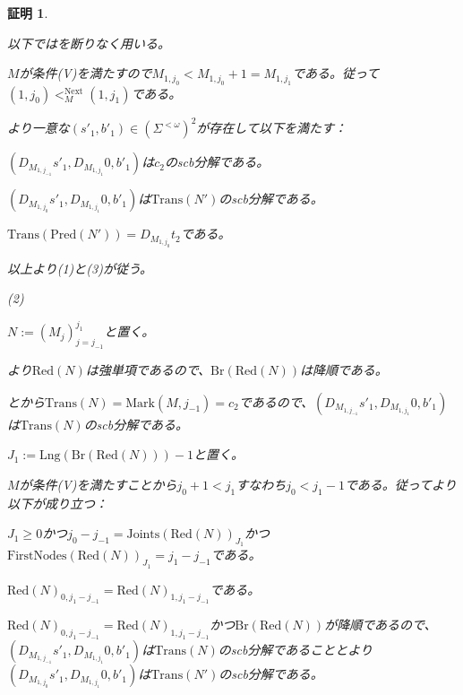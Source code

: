 \documentclass[dvipdfmx,uplatex]{jsarticle}
\theoremstyle{customnonumberbreakfortheorem}
\theoremstyle{customnonumberbreakforproof}
\newtheorem{hideableproof}{証明}
\begin{document}
\begin{hideableproof}
	\begin{indented}
		\item 以下ではを断りなく用いる。
		\item \(M\)が条件(V)を満たすので\(M_{1,j_0} < M_{1,j_0}+1 = M_{1,j_1}\)である。従って\((1,j_0) <_M^{\textrm{Next}} (1,j_1)\)である。
		\item {}より一意な\((s'_1,b'_1) \in (\Sigma^{< \omega})^2\)が存在して以下を満たす：
		\begin{penumerate}
			\item \((D_{M_{1,j_{-1}}} s'_1,D_{M_{1,j_1}} 0,b'_1)\)は\(c_2\)のscb分解である。
			\item \((D_{M_{1,j_0}} s'_1,D_{M_{1,j_1}} 0,b'_1)\)は\(\textrm{Trans}(N')\)のscb分解である。
			\item \(\textrm{Trans}(\textrm{Pred}(N')) = D_{M_{1,j_0}} t_2\)である。
		\end{penumerate}
		\item 以上より(1)と(3)が従う。
		\item
		\item (2)
		\item \(N := (M_j)_{j=j_{-1}}^{j_1}\)と置く。
		\item {}より\(\textrm{Red}(N)\)は強単項であるので、\(\textrm{Br}(\textrm{Red}(N))\)は降順である。
		\item {}とから\(\textrm{Trans}(N) = \textrm{Mark}(M,j_{-1}) = c_2\)であるので、\((D_{M_{1,j_{-1}}} s'_1,D_{M_{1,j_1}} 0,b'_1)\)は\(\textrm{Trans}(N)\)のscb分解である。
		\item \(J_1 := \textrm{Lng}(\textrm{Br}(\textrm{Red}(N)))-1\)と置く。
		\item \(M\)が条件(V)を満たすことから\(j_0+1 < j_1\)すなわち\(j_0 < j_1-1\)である。従ってより以下が成り立つ：
		\begin{penumerate}
			\item \(J_1 \geq 0\)かつ\(j_0-j_{-1} = \textrm{Joints}(\textrm{Red}(N))_{J_1}\)かつ\(\textrm{FirstNodes}(\textrm{Red}(N))_{J_1} = j_1-j_{-1}\)である。
			\item \(\textrm{Red}(N)_{0,j_1-j_{-1}} = \textrm{Red}(N)_{1,j_1-j_{-1}}\)である。
		\end{penumerate}
		\item \(\textrm{Red}(N)_{0,j_1-j_{-1}} = \textrm{Red}(N)_{1,j_1-j_{-1}}\)かつ\(\textrm{Br}(\textrm{Red}(N))\)が降順であるので、\((D_{M_{1,j_{-1}}} s'_1,D_{M_{1,j_1}} 0,b'_1)\)は\(\textrm{Trans}(N)\)のscb分解であることとより\((D_{M_{1,j_0}} s'_1,D_{M_{1,j_1}} 0,b'_1)\)は\(\textrm{Trans}(N')\)のscb分解である。

\end{indented}
\end{hideableproof}
\end{document}
